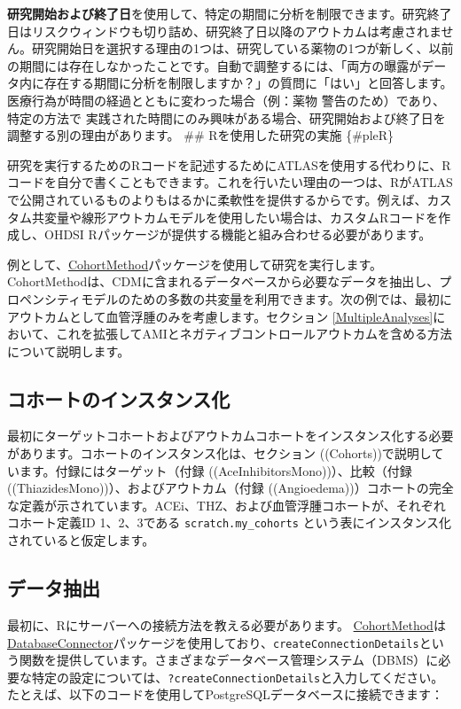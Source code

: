 \documentclass[
  11pt]{book}
\theoremstyle{definition}
\theoremstyle{definition}
\theoremstyle{definition}
\theoremstyle{definition}
\theoremstyle{remark}
\begin{document}
\textbf{研究開始および終了日}を使用して、特定の期間に分析を制限できます。研究終了日はリスクウィンドウも切り詰め、研究終了日以降のアウトカムは考慮されません。研究開始日を選択する理由の1つは、研究している薬物の1つが新しく、以前の期間には存在しなかったことです。自動で調整するには、「両方の曝露がデータ内に存在する期間に分析を制限しますか？」の質問に「はい」と回答します。医療行為が時間の経過とともに変わった場合（例：薬物 警告のため）であり、特定の方法で 実践された時間にのみ興味がある場合、研究開始および終了日を調整する別の理由があります。
\#\# Rを使用した研究の実施 \{\#pleR\}

研究を実行するためのRコードを記述するためにATLASを使用する代わりに、Rコードを自分で書くこともできます。これを行いたい理由の一つは、RがATLASで公開されているものよりもはるかに柔軟性を提供するからです。例えば、カスタム共変量や線形アウトカムモデルを使用したい場合は、カスタムRコードを作成し、OHDSI Rパッケージが提供する機能と組み合わせる必要があります。

例として、\href{https://ohdsi.github.io/CohortMethod/}{CohortMethod}パッケージを使用して研究を実行します。CohortMethodは、CDMに含まれるデータベースから必要なデータを抽出し、プロペンシティモデルのための多数の共変量を利用できます。次の例では、最初にアウトカムとして血管浮腫のみを考慮します。セクション \ref{MultipleAnalyses}において、これを拡張してAMIとネガティブコントロールアウトカムを含める方法について説明します。

\subsection{コホートのインスタンス化}\label{ux30b3ux30dbux30fcux30c8ux306eux30a4ux30f3ux30b9ux30bfux30f3ux30b9ux5316}

最初にターゲットコホートおよびアウトカムコホートをインスタンス化する必要があります。コホートのインスタンス化は、セクション (\citet{ref}(Cohorts))で説明しています。付録にはターゲット（付録 (\citet{ref}(AceInhibitorsMono))）、比較（付録 (\citet{ref}(ThiazidesMono))）、およびアウトカム（付録 (\citet{ref}(Angioedema))）コホートの完全な定義が示されています。ACEi、THZ、および血管浮腫コホートが、それぞれコホート定義ID 1、2、3である \texttt{scratch.my\_cohorts} という表にインスタンス化されていると仮定します。

\subsection{データ抽出}\label{ux30c7ux30fcux30bfux62bdux51fa-1}

最初に、Rにサーバーへの接続方法を教える必要があります。 \href{https://ohdsi.github.io/CohortMethod/}{CohortMethod}は\href{https://ohdsi.github.io/DatabaseConnector/}{DatabaseConnector}パッケージを使用しており、\texttt{createConnectionDetails}という関数を提供しています。さまざまなデータベース管理システム（DBMS）に必要な特定の設定については、\texttt{?createConnectionDetails}と入力してください。たとえば、以下のコードを使用してPostgreSQLデータベースに接続できます：
\end{document}
